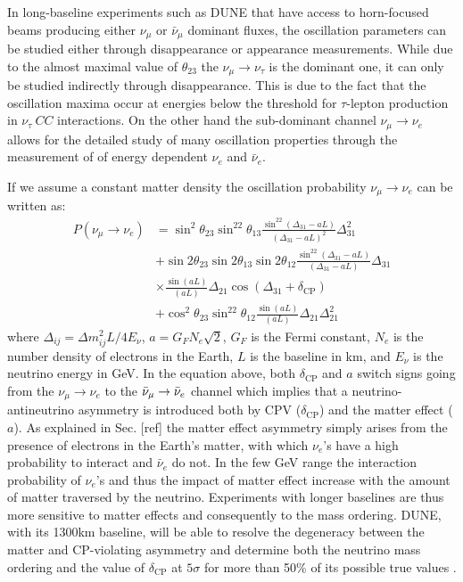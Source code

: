 In long-baseline experiments such as DUNE that have access to horn-focused beams producing either $\nu_\mu$ or $\bar{\nu}_\mu$ dominant fluxes, the oscillation parameters can be studied either through disappearance or appearance measurements. While due to the almost maximal value of $\theta_{23}$ the $\nu_\mu\rightarrow\nu_\tau$ is the dominant one, it can only be studied indirectly through disappearance. This is due to the fact that the oscillation maxima occur at energies below the threshold for $\tau$-lepton production in $\nu_\tau \ CC$ interactions. On the other hand the sub-dominant channel $\nu_\mu\rightarrow\nu_e$ allows for the detailed study of many oscillation properties through the measurement of of energy dependent $\nu_e$ and $\bar{\nu}_e$.

If we assume a constant matter density the oscillation probability $\nu_\mu\rightarrow\nu_e$ can be written as:
\begin{equation} \label{eq1}
    \begin{split}
        P(\nu_\mu\rightarrow\nu_e) & = \sin^2\theta_{23} \sin^22\theta_{13} \frac{\sin^22(\Delta_{31}-aL)}{(\Delta_{31}-aL)^2}\Delta_{31}^2\\
         &  +\sin2\theta_{23} \sin2\theta_{13} \sin2\theta_{12} \frac{\sin^22(\Delta_{31}-aL)}{(\Delta_{31}-aL)}\Delta_{31}\\
         & \times\frac{\sin(aL)}{(aL)}\Delta_{21} \cos(\Delta_{31}+\delta_\textrm{CP})\\
         & +\cos^2\theta_{23} \sin^22\theta_{12} \frac{\sin(aL)}{(aL)}\Delta_{21} \Delta_{21}^2
    \end{split}
\end{equation}
where $\Delta_{ij}=\Delta m_{ij}^2L/4E_\nu$, $a = G_FN_e\sqrt{2}$, $G_F$ is the Fermi constant, $N_e$ is the number density of electrons in the Earth, $L$ is the baseline in km, and $E_\nu$ is the neutrino energy in GeV. In the
equation above, both $\delta_\textrm{CP}$ and $a$ switch signs going from the $\nu_\mu\rightarrow\nu_e$ to the $\bar{\nu}_\mu\rightarrow\Bar{\nu}_e$ channel which implies that a neutrino-antineutrino asymmetry is introduced both by CPV ($\delta_\textrm{CP}$) and the matter effect ($a$). As explained in Sec. [ref] the matter effect asymmetry simply arises from the presence of electrons in the Earth's matter, with which $\nu_e$'s have a high probability to interact and $\bar{\nu}_e$ do not. In the few GeV range the interaction probability of $\nu_e$'s and thus the  impact of matter effect increase with the amount of matter traversed by the neutrino. Experiments with longer baselines are thus more sensitive to matter effects and consequently to the mass ordering. DUNE, with its 1300km baseline, will be able to resolve the degeneracy between the matter and CP-violating asymmetry and determine both the neutrino mass ordering and the value of $\delta_\text{CP}$ at $5\sigma$ for more than 50\% of its possible true values \cite{Diwan:2004bt}.

